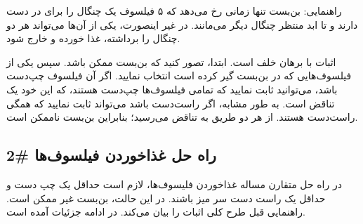 \documentclass{book}
\newcommand{\clearemptydoublepage}{\newpage\cleardoublepage}
\begin{document}
    راهنمایی: بن‌بست تنها زمانی رخ می‌دهد که ۵ فیلسوف یک چنگال را برای در دست دارند و تا ابد منتظر چنگال دیگر می‌مانند. 
    در غیر اینصورت، یکی از آن‌ها می‌تواند هر دو چنگال را برداشته، غذا خورده و خارج شود. 

    اثبات با برهان خلف است.  ابتدا، تصور کنید که بن‌بست ممکن باشد. 
    سپس یکی از فیلسوف‌هایی که در بن‌بست گیر کرده است انتخاب نمایید. 
    اگر آن فیلسوف چپ‌دست باشد،‌ می‌توانید ثابت نمایید که تمامی‌ فیلسوف‌ها چپ‌دست هستند، که این خود یک تناقض است. 
    به طور مشابه، اگر راست‌دست باشد می‌تواند ثابت نمایید که همگی راست‌دست هستند. از هر دو طریق به تناقض می‌رسید؛ بنابراین 
    بن‌بست ناممکن است. 
    

\clearemptydoublepage
\subsection{راه حل غذاخوردن فیلسوف‌ها \#2}

    در راه حل متقارن مساله غذاخوردن فلیسوف‌ها، لازم است حداقل یک چپ دست و  حداقل یک راست دست سر میز باشند. 
    در این حالت، بن‌بست غیر ممکن است. راهنمایی قبل طرح کلی اثبات را بیان می‌کند.
    در ادامه جزئیات آمده است. 
\end{document}
